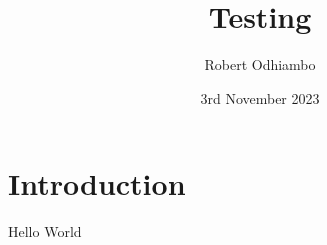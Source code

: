 \documentclass{article}
\title{Testing}
\author{Robert Odhiambo}
\date{3rd November 2023}
\begin{document}
\maketitle
\section{Introduction}
Hello World
\end{document}
